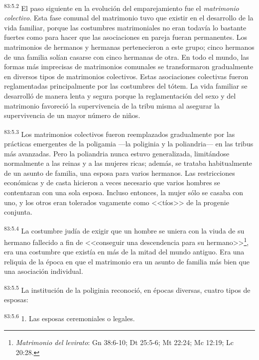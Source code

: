\documentclass[twoside, 11pt]{book}
\begin{document}
\par
\textsuperscript{83:5.2} El paso siguiente en la evolución del emparejamiento fue el \textit{matrimonio colectivo}. Esta fase comunal del matrimonio tuvo que existir en el desarrollo de la vida familiar, porque las costumbres matrimoniales no eran todavía lo bastante fuertes como para hacer que las asociaciones en pareja fueran permanentes. Los matrimonios de hermanos y hermanas pertenecieron a este grupo; cinco hermanos de una familia solían casarse con cinco hermanas de otra. En todo el mundo, las formas más imprecisas de matrimonios comunales se transformaron gradualmente en diversos tipos de matrimonios colectivos. Estas asociaciones colectivas fueron reglamentadas principalmente por las costumbres del tótem. La vida familiar se desarrolló de manera lenta y segura porque la reglamentación del sexo y del matrimonio favoreció la supervivencia de la tribu misma al asegurar la supervivencia de un mayor número de niños.

\par
\textsuperscript{83:5.3} Los matrimonios colectivos fueron reemplazados gradualmente por las prácticas emergentes de la poligamia ---la poliginia y la poliandria--- en las tribus más avanzadas. Pero la poliandria nunca estuvo generalizada, limitándose normalmente a las reinas y a las mujeres ricas; además, se trataba habitualmente de un asunto de familia, una esposa para varios hermanos. Las restricciones económicas y de casta hicieron a veces necesario que varios hombres se contentaran con una sola esposa. Incluso entonces, la mujer sólo se casaba con uno, y los otros eran tolerados vagamente como <<tíos>> de la progenie conjunta.

\par
\textsuperscript{83:5.4} La costumbre judía de exigir que un hombre se uniera con la viuda de su hermano fallecido a fin de <<conseguir una descendencia para su hermano>>\footnote{\textit{Matrimonio del levirato}: Gn 38:6-10; Dt 25:5-6; Mt 22:24; Mc 12:19; Lc 20:28.}, era una costumbre que existía en más de la mitad del mundo antiguo. Era una reliquia de la época en que el matrimonio era un asunto de familia más bien que una asociación individual.

\par
\textsuperscript{83:5.5} La institución de la poliginia reconoció, en épocas diversas, cuatro tipos de esposas:

\par
\textsuperscript{83:5.6} 1. Las esposas ceremoniales o legales.
\end{document}
